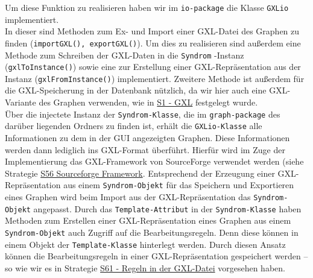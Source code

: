\documentclass[enabledeprecatedfontcommands,fontsize=11pt,paper=a4,twoside]{scrartcl}
\newcounter{one}
\begin{document}
 Um diese Funktion zu realisieren haben wir im \texttt{io-package} die Klasse \texttt{GXLio} implementiert. \\
In dieser sind Methoden zum Ex- und Import einer GXL-Datei des Graphen zu finden (\texttt{importGXL(), exportGXL()}). Um dies zu realisieren sind außerdem eine Methode zum Schreiben der GXL-Daten in die \texttt{Syndrom} -Instanz (\texttt{gxlToInstance()}) sowie eine zur Erstellung einer GXL-Repräsentation aus der Instanz (\texttt{gxlFromInstance()}) implementiert. Zweitere Methode ist außerdem für die GXL-Speicherung in der Datenbank nützlich, da wir hier auch eine GXL-Variante des Graphen verwenden, wie in \hyperlink{yy}{S1 - GXL} festgelegt wurde.\\
Über die injectete Instanz der \texttt{Syndrom-Klasse}, die im \texttt{graph-package} des darüber liegenden Ordners zu finden ist, erhält die \texttt{GXLio-Klasse} alle Informationen zu dem in der GUI angezeigten Graphen. 
Diese Informationen werden dann lediglich ins GXL-Format überführt. Hierfür wird im Zuge der Implementierung das GXL-Framework von SourceForge verwendet werden (siehe Strategie \hyperlink{xaa}{S56 Sourceforge Framework}. Entsprechend der Erzeugung einer GXL-Repräsentation aus einem \texttt{Syndrom-Objekt} für das Speichern und Exportieren eines Graphen wird beim Import aus der GXL-Repräsentation das \texttt{Syndrom-Objekt} angepasst. Durch das \texttt{Template-Attribut} in der \texttt{Syndrom-Klasse} haben Methoden zum Erstellen einer GXL-Repräsentation eines Graphen aus einem \texttt{Syndrom-Objekt} auch Zugriff auf die Bearbeitungsregeln. Denn diese können in einem Objekt der \texttt{Template-Klasse} hinterlegt werden. Durch diesen Ansatz können die Bearbeitungsregeln in einer GXL-Repräsentation gespeichert werden – so wie wir es in Strategie \hyperlink{vvv}{S61 - Regeln in der GXL-Datei} vorgesehen haben. \\ \\
\end{document}
